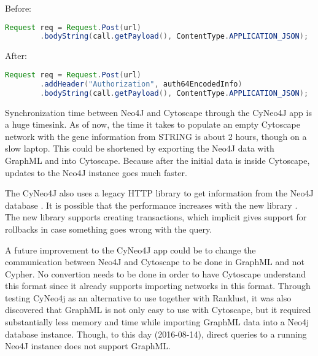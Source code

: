 Before:
\begin{lstlisting}[frame=single,language=Java]
Request req = Request.Post(url)
        .bodyString(call.getPayload(), ContentType.APPLICATION_JSON);
\end{lstlisting}

After:
\begin{lstlisting}[frame=single,language=Java]
Request req = Request.Post(url)
        .addHeader("Authorization", auth64EncodedInfo)
        .bodyString(call.getPayload(), ContentType.APPLICATION_JSON);
\end{lstlisting}

Synchronization time between Neo4J and Cytoscape through the CyNeo4J app is a
huge timesink. As of now, the time it takes to populate an empty Cytoscape
network with the gene information from STRING is about 2 hours, though on a slow
laptop. This could be shortened by exporting the Neo4J data with GraphML and
into Cytoscape. Because after the initial data is inside Cytoscape, updates to
the Neo4J instance goes much faster.

The CyNeo4J also uses a legacy HTTP library to get information from the Neo4J
database \cite{legacy-neo4j}. It is possible that the performance increases with
the new library \cite{transactional-neo4j}. The new library supports creating
transactions, which implicit gives support for rollbacks in case something goes
wrong with the query.

A future improvement to the CyNeo4J app could be to change the communication
between Neo4J and Cytoscape to be done in GraphML and not Cypher. No convertion
needs to be done in order to have Cytoscape understand this format since it
already supports importing networks in this format. Through testing CyNeo4j as
an alternative to use together with Ranklust, it was also discovered that
GraphML is not only easy to use with Cytoscape, but it required substantially
less memory and time while importing GraphML data into a Neo4j database
instance. Though, to this day (2016-08-14), direct queries to a running Neo4J
instance does not support GraphML.

